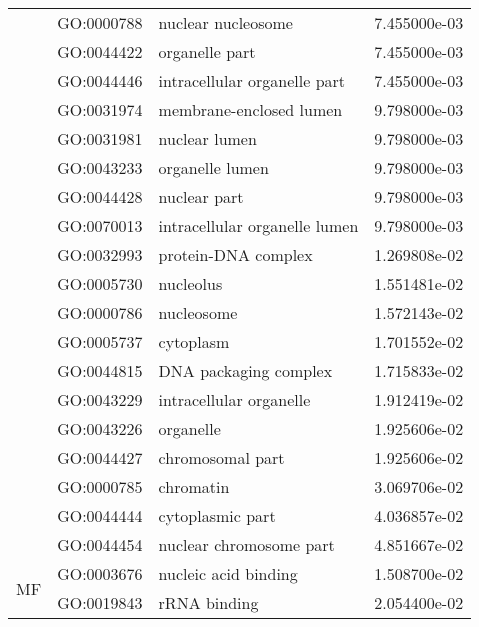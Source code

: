 \begin{longtable}{lllr}
   & GO:0000788 &                           nuclear nucleosome &  7.455000e-03 \\
   & GO:0044422 &                               organelle part &  7.455000e-03 \\
   & GO:0044446 &                 intracellular organelle part &  7.455000e-03 \\
   & GO:0031974 &                      membrane-enclosed lumen &  9.798000e-03 \\
   & GO:0031981 &                                nuclear lumen &  9.798000e-03 \\
   & GO:0043233 &                              organelle lumen &  9.798000e-03 \\
   & GO:0044428 &                                 nuclear part &  9.798000e-03 \\
   & GO:0070013 &                intracellular organelle lumen &  9.798000e-03 \\
   & GO:0032993 &                          protein-DNA complex &  1.269808e-02 \\
   & GO:0005730 &                                    nucleolus &  1.551481e-02 \\
   & GO:0000786 &                                   nucleosome &  1.572143e-02 \\
   & GO:0005737 &                                    cytoplasm &  1.701552e-02 \\
   & GO:0044815 &                        DNA packaging complex &  1.715833e-02 \\
   & GO:0043229 &                      intracellular organelle &  1.912419e-02 \\
   & GO:0043226 &                                    organelle &  1.925606e-02 \\
   & GO:0044427 &                             chromosomal part &  1.925606e-02 \\
   & GO:0000785 &                                    chromatin &  3.069706e-02 \\
   & GO:0044444 &                             cytoplasmic part &  4.036857e-02 \\
   & GO:0044454 &                      nuclear chromosome part &  4.851667e-02 \\
\cline{1-4}
\multirow{2}{*}{MF} & GO:0003676 &                         nucleic acid binding &  1.508700e-02 \\
   & GO:0019843 &                                 rRNA binding &  2.054400e-02 \\
\end{longtable}

